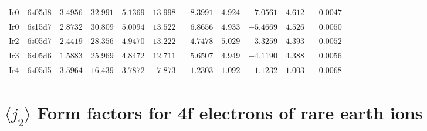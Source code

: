 \begin{table}[H]
{\begin{tabular}{llrrrrrrrrr}
Ir0 & 6s05d8 &$3.4956$ &$32.991$ &$5.1369$ &$13.998$ &$8.3991$ &$4.924$ &$-7.0561$ &$4.612$ &$0.0047$ \\
Ir0 & 6s15d7 &$2.8732$ &$30.809$ &$5.0094$ &$13.522$ &$6.8656$ &$4.933$ &$-5.4669$ &$4.526$ &$0.0050$ \\
Ir2 & 6s05d7 &$2.4419$ &$28.356$ &$4.9470$ &$13.222$ &$4.7478$ &$5.029$ &$-3.3259$ &$4.393$ &$0.0052$ \\
Ir3 & 6s05d6 &$1.5883$ &$25.969$ &$4.8472$ &$12.711$ &$5.6507$ &$4.949$ &$-4.1190$ &$4.388$ &$0.0056$ \\
Ir4 & 6s05d5 &$3.5964$ &$16.439$ &$3.7872$ &$7.873$ &$-1.2303$ &$1.092$ &$1.1232$ &$1.003$ &$-0.0068$ \\
\hline
\end{tabular}
}
\end{table}
\section{{\large $\langle j_2\rangle$} Form factors for 4f electrons of rare earth ions}
